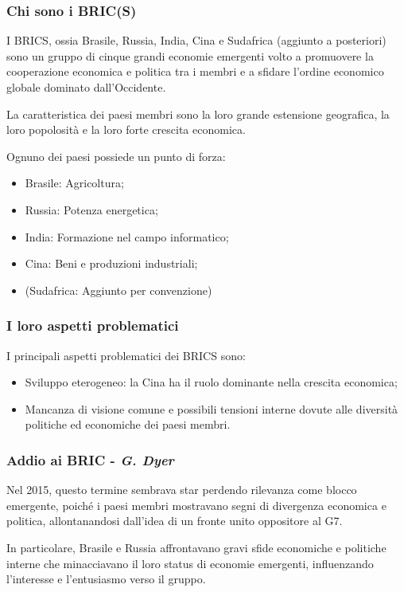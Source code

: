 \documentclass{article}
\begin{document}
\subsubsection{Chi sono i BRIC(S)}
I BRICS, ossia Brasile, Russia, India, Cina e Sudafrica (aggiunto a posteriori) sono un gruppo 
di cinque grandi economie emergenti volto a promuovere la cooperazione economica e politica
tra i membri e a sfidare l'ordine economico globale dominato dall'Occidente.

La caratteristica dei paesi membri sono la loro grande estensione geografica, la loro popolosità
e la loro forte crescita economica.

Ognuno dei paesi possiede un punto di forza:
\begin{itemize}
    \item Brasile: Agricoltura;
    \item Russia: Potenza energetica;
    \item India: Formazione nel campo informatico;
    \item Cina: Beni e produzioni industriali;
    \item (Sudafrica: Aggiunto per convenzione)
\end{itemize}

\subsubsection{I loro aspetti problematici}
I principali aspetti problematici dei BRICS sono:
\begin{itemize}
    \item Sviluppo eterogeneo: la Cina ha il ruolo dominante nella crescita economica;
    \item Mancanza di visione comune e possibili tensioni interne dovute alle diversità
        politiche ed economiche dei paesi membri.
\end{itemize}

\subsubsection{Addio ai BRIC - \textit{G. Dyer}}
Nel 2015, questo termine sembrava star perdendo rilevanza come blocco emergente,
poiché i paesi membri mostravano segni di divergenza economica e politica, allontanandosi
dall'idea di un fronte unito oppositore al G7.

In particolare, Brasile e Russia affrontavano gravi sfide economiche e politiche interne che
minacciavano il loro status di economie emergenti, influenzando l'interesse e l'entusiasmo verso
il gruppo.
\end{document}
